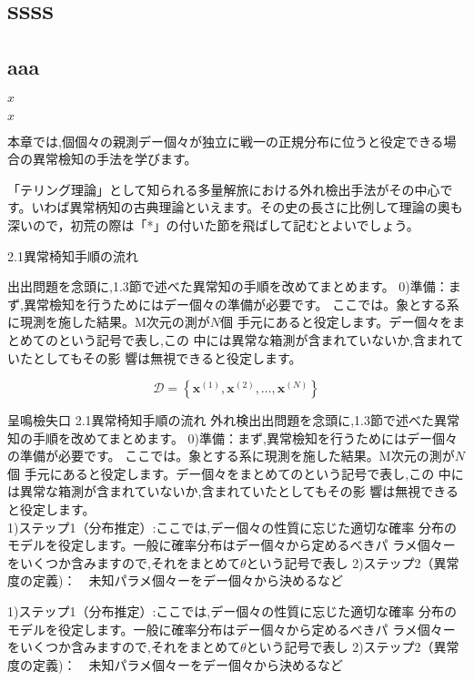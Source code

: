 \documentclass{book}
\begin{document}
\chapter{ssss}

\section{aaa}

\( x \)

$x$

\centering \Huge

本章では,個個々の親測デー個々が独立に戦一の正規分布に位うと役定できる場合の異常檢知の手法を学びます。

「テリング理論」として知られる多量解旅における外れ檢出手法がその中心です。いわば異常柄知の古典理論といえます。その史の長さに比例して理論の奧も深いので，初荒の際は「*」の付いた節を飛ばして記むとよいでしょう。


2.1異常椅知手順の流れ

出出問題を念頭に,1.3節で述べた異常知の手順を改めてまとめます。
0)準備：まず,異常檢知を行うためにはデー個々の準備が必要です。
ここでは。象とする系に現測を施した結果。M次元の測が$N$個
手元にあると役定します。デー個々をまとめてのという記号で表し,この
中には異常な箱測が含まれていないか,含まれていたとしてもその影
響は無視できると役定します。

$$
\mathcal{D}=\left\{\boldsymbol{x}^{(1)},\boldsymbol{x}^{(2)},\ldots,\boldsymbol{x}^{(N)}\right\}
$$


呈鳴檢失口
2.1異常椅知手順の流れ
外れ検出出問題を念頭に,1.3節で述べた異常知の手順を改めてまとめます。
0)準備：まず,異常檢知を行うためにはデー個々の準備が必要です。
ここでは。象とする系に現測を施した結果。M次元の測が$N$個
手元にあると役定します。デー個々をまとめてのという記号で表し,この
中には異常な箱測が含まれていないか,含まれていたとしてもその影
響は無視できると役定します。
$$
$$
1)ステップ1（分布推定）:ここでは,デー個々の性質に忘じた適切な確率
分布のモデルを役定します。一般に確率分布はデー個々から定めるべきパ
ラメ個々ーをいくつか含みますので,それをまとめて$\theta$という記号で表し
2)ステップ2（異常度の定義)：$\quad$未知パラメ個々ーをデー個々から決めるなど



1)ステップ1（分布推定）:ここでは,デー個々の性質に忘じた適切な確率
分布のモデルを役定します。一般に確率分布はデー個々から定めるべきパ
ラメ個々ーをいくつか含みますので,それをまとめて$\theta$という記号で表し
2)ステップ2（異常度の定義)：$\quad$未知パラメ個々ーをデー個々から決めるなど
\end{document}
